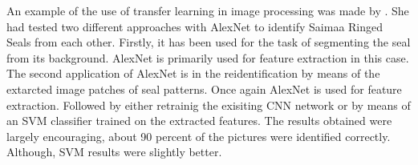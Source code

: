 \documentclass[doc/report.tex]{subfiles}
\begin{document}
An example of the use of transfer learning in image processing was made by
\cite{Ekat}. She had tested two different approaches with AlexNet to identify
Saimaa Ringed Seals from each other. Firstly, it has been used for the task of
segmenting the seal from its background. AlexNet is primarily used for feature
extraction in this case. The second application of AlexNet is in the
reidentification by means of the extarcted image patches of seal patterns. Once
again AlexNet is used for feature extraction. Followed by either retrainig the
exisiting CNN network or by means of an SVM classifier trained on the extracted
features. The results obtained were largely encouraging, about 90 percent of
the pictures were identified correctly. Although, SVM results were slightly
better.
\end{document}
